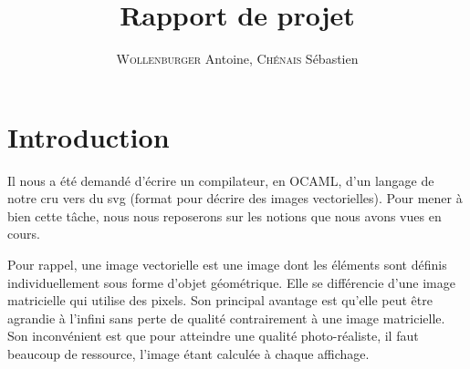 \documentclass[11pt]{report} %
\title{Rapport de projet}
\author{\textsc{Wollenburger} Antoine, \textsc{Chénais} Sébastien}
\date{} %
\renewcommand{\headrulewidth}{0pt} %
\begin{document}
\fancyhead[LE,CE,RE,LO,CO,RO]{}
\fancyfoot[LE,CE,RE,LO,CO,RO]{}

\renewcommand{\headrulewidth}{0.4pt}

\maketitle

\renewcommand{\contentsname}{Sommaire} %
\tableofcontents

\chapter*{Introduction}
Il nous a été demandé d'écrire un compilateur, en OCAML, d'un langage de notre cru vers du svg (format pour décrire des images vectorielles). Pour mener à bien cette tâche, nous nous reposerons sur les notions que nous avons vues en cours.

Pour rappel, une image vectorielle est une image dont les éléments sont définis individuellement sous forme d'objet géométrique. Elle se différencie d'une image matricielle qui utilise des pixels. Son principal avantage est qu'elle peut être agrandie à l'infini sans perte de qualité contrairement à une image matricielle. Son inconvénient est que pour atteindre une qualité photo-réaliste, il faut beaucoup de ressource, l'image étant calculée à chaque affichage.
\end{document}

